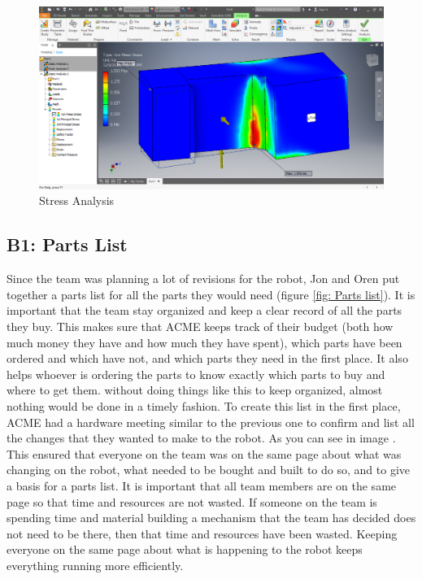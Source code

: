 \documentclass{article}
\begin{document}
\begin{figure}
    \centering
    \includegraphics[width=.6\textwidth]{14_12-03/images/Stress_Analysis.png}
    \caption{Stress Analysis}
    \label{fig:stress}
\end{figure}\subsection{B1: Parts List}

Since the team was planning a lot of revisions for the robot, Jon and Oren put together a parts list for all the parts they would need (figure \ref{fig: Parts list}). It is important that the team stay organized and keep a clear record of all the parts they buy. This makes sure that ACME keeps track of their budget (both how much money they have and how much they have spent), which parts have been ordered and which have not, and which parts they need in the first place. It also helps whoever is ordering the parts to know exactly which parts to buy and where to get them. without doing things like this to keep organized, almost nothing would be done in a timely fashion. To create this list in the first place, ACME had a hardware meeting similar to the previous one to confirm and list all the changes that they wanted to make to the robot. As you can see in image . This ensured that everyone on the team was on the same page about what was changing on the robot, what needed to be bought and built to do so, and to give a basis for a parts list. It is important that all team members are on the same page so that time and resources are not wasted. If someone on the team is spending time and material building a mechanism that the team has decided does not need to be there, then that time and resources have been wasted. Keeping everyone on the same page about what is happening to the robot keeps everything running more efficiently.
\end{document}
